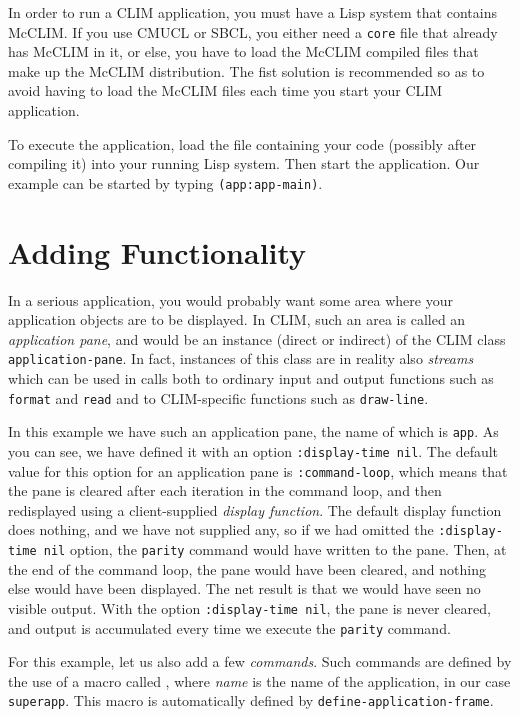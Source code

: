 In order to run a CLIM application, you must have a Lisp system that
contains McCLIM.  If you use CMUCL or SBCL, you either need a \texttt{core}
file that already has McCLIM in it, or else, you have to load the McCLIM
compiled files that make up the McCLIM distribution.  The fist solution
is recommended so as to avoid having to load the McCLIM files each time
you start your CLIM application.

To execute the application, load the file containing your code (possibly
after compiling it) into your running Lisp system.  Then start the
application.  Our example can be started by typing \texttt{(app:app-main)}.

\section{Adding Functionality}

In a serious application, you would probably want some area where your
application objects are to be displayed.  In CLIM, such an area is
called an \emph{application pane}, and would be an instance (direct or
indirect) of the CLIM class \texttt{application-pane}.  In fact, instances of
this class are in reality also \emph{streams} which can be used in calls
both to ordinary input and output functions such as \texttt{format} and
\texttt{read} and to CLIM-specific functions such as \texttt{draw-line}.

In this example we have such an application pane, the name of which is
\texttt{app}.  As you can see, we have defined it with an option
\texttt{:display-time nil}.  The default value for this option for an
application pane is \texttt{:command-loop}, which means that the pane is
cleared after each iteration in the command loop, and then redisplayed
using a client-supplied \emph{display function}.  The default display
function does nothing, and we have not supplied any, so if we had
omitted the \texttt{:display-time nil} option, the \texttt{parity} command would
have written to the pane.  Then, at the end of the command loop, the
pane would have been cleared, and nothing else would have been
displayed.  The net result is that we would have seen no visible output.
With the option \texttt{:display-time nil}, the pane is never cleared, and
output is accumulated every time we execute the \texttt{parity} command.

For this example, let us also add a few \emph{commands}.
Such commands are defined by the use of a macro called
, where \textit{name} is the name of
the application, in our case \texttt{superapp}. This macro is automatically
defined by \texttt{define-application-frame}.

